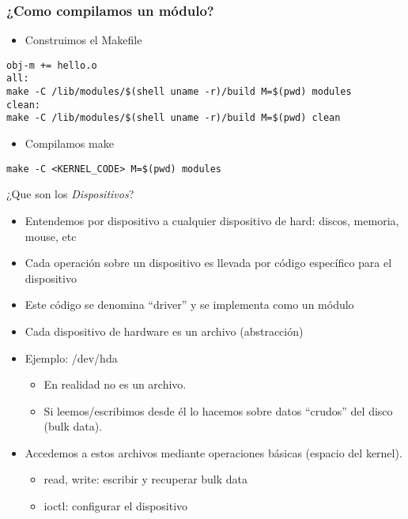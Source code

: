 \begin{frame}[fragile]
\frametitle{¿Como compilamos un módulo?}
  \begin{itemize}
  \item Construimos el Makefile
  \end{itemize}
\begin{lstlisting}
obj-m += hello.o
all:
make -C /lib/modules/$(shell uname -r)/build M=$(pwd) modules
clean:
make -C /lib/modules/$(shell uname -r)/build M=$(pwd) clean
\end{lstlisting}
  \begin{itemize}
  \item Compilamos make
  \end{itemize}
\begin{lstlisting}
make -C <KERNEL_CODE> M=$(pwd) modules
\end{lstlisting}

\end{frame}

\begin{frame}{¿Que son los \textit{Dispositivos}?}
  \begin{itemize}
	\item Entendemos por dispositivo a cualquier dispositivo de hard: discos, memoria, mouse, etc
	\item Cada operación sobre un dispositivo es llevada por código específico para el dispositivo
	\item Este código se denomina “driver” y se implementa como un módulo
        \item Cada dispositivo de hardware es un archivo (abstracción)
 	\item Ejemplo: /dev/hda
	\begin{itemize}
		\item En realidad no es un archivo.
		\item Si leemos/escribimos desde él lo hacemos sobre datos “crudos” del disco (bulk data).
	\end{itemize}
         \item Accedemos a estos archivos mediante operaciones básicas (espacio del kernel).
	\begin{itemize}
		\item read, write: escribir y recuperar bulk data
		\item ioctl: configurar el dispositivo 

	\end{itemize}
  \end{itemize}
\end{frame}


